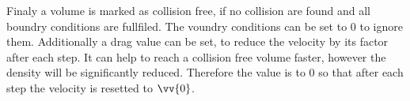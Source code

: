 % 
Finaly a volume is marked as collision free, if no collision are found and all boundry conditions are fullfiled. 
The voundry conditions can be set to 0 to ignore them.
Additionally a drag value can be set, to reduce the velocity by its factor after each step.
It can help to reach a collision free volume faster, however the density will be significantly reduced.
Therefore the value is to 0 so that after each step the velocity is resetted to $\vv{0}$. 
% 
%
% 
% 

